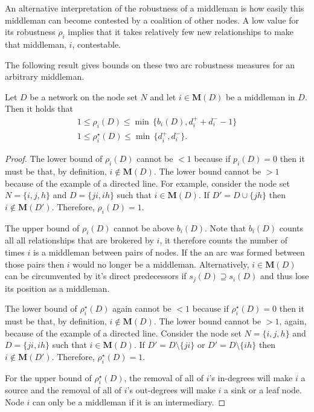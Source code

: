 An alternative interpretation of the robustness of a middleman is how easily this middleman can become contested by a coalition of other nodes. A low value for its robustness $\rho_{i}$ implies that it takes relatively few new relationships to make that middleman, $i$, contestable.

The following result gives bounds on these two arc robustness measures for an arbitrary middleman.
\begin{proposition} \label{prop:bounds}
	Let $D$ be a network on the node set $N$ and let $i \in \mathbf M (D)$ be a middleman in $D$. Then it holds that
	\begin{gather}
		1 \leqslant \rho_i (D) \leqslant \min \, \{ b_i (D) , d^+_i + d^-_i - 1 \} \\
		1 \leqslant \rho^{\star}_i (D) \leqslant \min \, \{ d^+_i , d^-_i \} .
	\end{gather}
\end{proposition}

\begin{proof}
The lower bound of $\rho_{i}(D)$ cannot be $< 1$ because if $p_{i}(D) = 0$ then it must be that, by definition, $i \notin \mathbf{M}(D)$. The lower bound cannot be $> 1$ because of the example of a directed line. For example, consider the node set $N = \{ i, j, h \}$ and $D = \{ ji, ih \}$ such that $i \in \mathbf{M}(D)$. If $D' = D \cup \{ jh \}$ then $i \notin \mathbf{M}(D')$. Therefore, $\rho_{i}(D) = 1$. 

The upper bound of $\rho_{i}(D)$ cannot be above $b_{i}(D)$. Note that $b_{i}(D)$ counts all all relationships that are brokered by $i$, it therefore counts the number of times $i$ is a middleman between pairs of nodes. If the an arc was formed between those pairs then $i$ would no longer be a middleman. Alternatively, $i \in \mathbf{M}(D)$ can be circumvented by it's direct predecessors if $s_{j}(D) \supseteq s_{i}(D)$ and thus lose its position as a middleman.

The lower bound of $\rho^{\star}_{i}(D)$ again cannot be $< 1$ because if $\rho^{\star}_{i}(D) = 0$ then it must be that, by definition, $i \notin \mathbf{M}(D)$. The lower bound cannot be $> 1$, again, because of the example of a directed line. Consider the node set $N = \{ i, j, h \}$ and $D = \{ ji, ih \}$ such that $i \in \mathbf{M}(D)$. If $D' = D \setminus \{ ji \}$ or $D' = D \setminus \{ ih \}$ then $i \notin \mathbf{M}(D')$. Therefore, $\rho^{\star}_{i}(D) = 1$.

For the upper bound of $\rho^{\star}_{i}(D)$, the removal of all of $i$'s in-degrees will make $i$ a source and the removal of all of $i$'s out-degrees will make $i$ a sink or a leaf node. Node $i$ can only be a middleman if it is an intermediary.
\end{proof}

